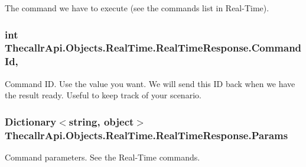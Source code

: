 The command we have to execute (see the commands list in Real-\/\+Time). 

\hypertarget{class_thecallr_api_1_1_objects_1_1_real_time_1_1_real_time_response_a3ae9aaf8c52ce3ab15fdb9e7f3f7175e}{
\subsubsection[{Command\+Id}]{\setlength{\rightskip}{0pt plus 5cm}int Thecallr\+Api.\+Objects.\+Real\+Time.\+Real\+Time\+Response.\+Command\+Id\hspace{0.3cm}{\ttfamily [get]}, {\ttfamily [set]}}}\label{class_thecallr_api_1_1_objects_1_1_real_time_1_1_real_time_response_a3ae9aaf8c52ce3ab15fdb9e7f3f7175e}


Command I\+D. Use the value you want. We will send this I\+D back when we have the result ready. Useful to keep track of your scenario. 

\hypertarget{class_thecallr_api_1_1_objects_1_1_real_time_1_1_real_time_response_ab2b41d0a7a68ec46295b7f1f86ce59fe}{
\subsubsection[{Params}]{\setlength{\rightskip}{0pt plus 5cm}Dictionary$<$string, object$>$ Thecallr\+Api.\+Objects.\+Real\+Time.\+Real\+Time\+Response.\+Params\hspace{0.3cm}{\ttfamily [get]}}}\label{class_thecallr_api_1_1_objects_1_1_real_time_1_1_real_time_response_ab2b41d0a7a68ec46295b7f1f86ce59fe}


Command parameters. See the Real-\/\+Time commands. 

